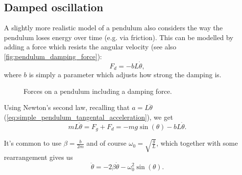 \subsection{Damped oscillation}
A slightly more realistic model of a pendulum also considers the way the pendulum loses energy over time (e.g. via friction). This can be modelled by adding a force which resists the angular velocity (see also \autoref{fig:pendulum_damping_force}):
\begin{equation}
	F_{d} = -bL\dot{\theta},
	\label{eq:damping_force}
\end{equation}
where $b$ is simply a parameter which adjusts how strong the damping is.

\begin{figure}
	\begin{center}
	\end{center}
	\caption{Forces on a pendulum including a damping force.}
	\label{fig:pendulum_damping_force}
\end{figure}

Using Newton's second law, recalling that $a=L\ddot{\theta}$ (\autoref{eq:simple_pendulum_tangental_acceleration}), we get
\begin{equation}
	mL\ddot{\theta} = F_{g} + F_{d} = -mg\sin(\theta) - bL\dot{\theta}.
	\label{eq:damped_pendulum_differential_equation}
\end{equation}

It's common to use $\beta=\frac{b}{2m}$ and of course $\omega_{0}=\sqrt{\frac{g}{L}}$, which together with some rearrangement gives us
\begin{equation}
	\ddot{\theta} = -2\beta\dot{\theta} -\omega_{0}^{2}\sin(\theta).
	\label{eq:damped_pendulum_differential_equation_2}
\end{equation}

